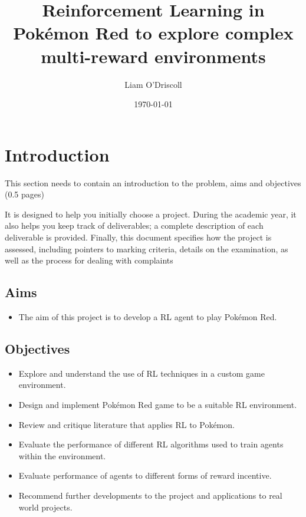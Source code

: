 \documentclass{surrey_disso_style}
\title{Reinforcement Learning in Pokémon Red to explore complex multi-reward environments}
\author{Liam O'Driscoll}
\date{\today}
\begin{document}
\maketitle

\section{Introduction}
This section needs to contain an introduction to the problem, aims and objectives (0.5 pages)
\par
[FROM THE HANDBOOK] \newline
It is designed to help you initially choose a project. During the academic year, it also helps
you keep track of deliverables; a complete description of each deliverable is provided. Finally,
this document specifies how the project is assessed, including pointers to marking criteria,
details on the examination, as well as the process for dealing with complaints

\subsection{Aims}

\begin{itemize}
   \item [\ding{54}] The aim of this project is to develop a RL agent to play Pokémon Red.
\end{itemize}

\subsection{Objectives}

\begin{itemize}
   \item [\ding{169}]Explore and understand the use of RL techniques in a custom game environment.
   \item [\ding{169}] Design and implement Pokémon Red game to be a suitable RL environment.
   \item [\ding{169}] Review and critique literature that applies RL to Pokémon.
   \item [\ding{169}] Evaluate the performance of different RL algorithms used to train agents within the environment.
   \item [\ding{169}] Evaluate performance of agents to different forms of reward incentive.
   \item [\ding{169}] Recommend further developments to the project and applications to real world projects.
\end{itemize}
\end{document}
